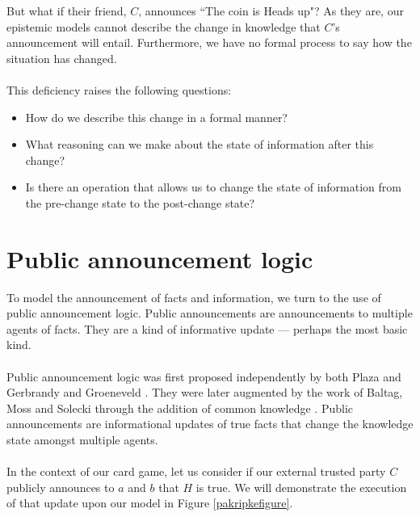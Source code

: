 But what if their friend, $C$, announces ``The coin is Heads up"?
As they are, our epistemic models cannot describe the change in knowledge that
$C$'s announcement will entail.
Furthermore, we have no formal process to say how the situation has changed.\\
\\
This deficiency raises the following questions:
\begin{itemize}
	\item How do we describe this change in a formal manner?
	\item What reasoning can we make about the state of information after this
	change?
	\item Is there an operation that allows us to change the state of information
	from the pre-change state to the post-change state?
\end{itemize}

\section{Public announcement logic}\label{pal}
To model the announcement of facts and information, we turn to the use of public
announcement logic.
Public announcements are announcements to multiple agents of facts.
They are a kind of informative update --- perhaps the most basic kind.\\
\\
Public announcement logic was first proposed independently by both Plaza and
Gerbrandy and Groeneveld \cite{plaza2007public,gelbrandy1997reasoning}.
They were later augmented by the work of Baltag, Moss and Solecki through the
addition of common knowledge \cite{baltag1998lpa}.
Public announcements are informational updates of true facts that change the
knowledge state amongst multiple agents.\\
\\
In the context of our card game, let us consider if our external trusted party
$C$ publicly announces to $a$ and $b$ that $H$ is true.
We will demonstrate the execution of that update upon our model in Figure
\ref{pakripkefigure}.

